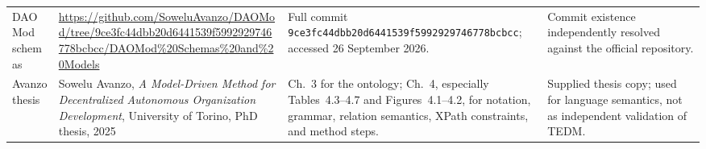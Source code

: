 \documentclass[10pt]{article}
\begin{document}
\begin{table}[h]
\begin{tabularx}{\linewidth}{@{}p{.14\linewidth}p{.29\linewidth}p{.20\linewidth}Y@{}}
DAOMod schemas & \url{https://github.com/SoweluAvanzo/DAOMod/tree/9ce3fc44dbb20d6441539f5992929746778bcbcc/DAOMod\%20Schemas\%20and\%20Models} & Full commit \nolinkurl{9ce3fc44dbb20d6441539f5992929746778bcbcc}; accessed 26 September 2026. & Commit existence independently resolved against the official repository. \\
Avanzo thesis & Sowelu Avanzo, \emph{A Model-Driven Method for Decentralized Autonomous Organization Development}, University of Torino, PhD thesis, 2025 & Ch.~3 for the ontology; Ch.~4, especially Tables~4.3--4.7 and Figures~4.1--4.2, for notation, grammar, relation semantics, XPath constraints, and method steps. & Supplied thesis copy; used for language semantics, not as independent validation of TEDM. \\
\bottomrule
\end{tabularx}
\end{table}
\end{document}
